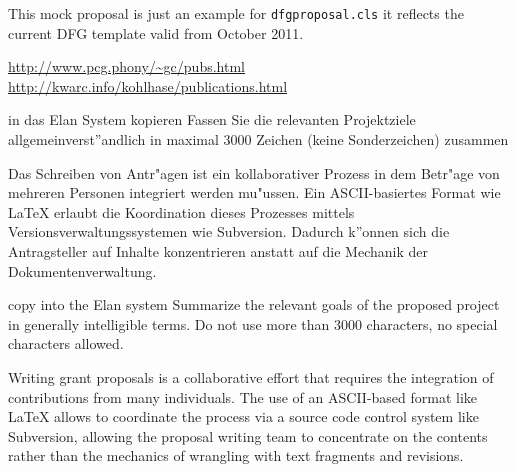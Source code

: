 \documentclass[RAM,gitinfo]{dfgproposal}
\begin{document}
\begin{center}\color{red}\huge
  This mock proposal is just an example for \texttt{dfgproposal.cls} it reflects the 
  current DFG template valid from October 2011.
\end{center}

\urldef{\gcpubs}\url{http://www.pcg.phony/~gc/pubs.html}
\urldef{\mikopubs}\url{http://kwarc.info/kohlhase/publications.html}
\begin{proposal}[PI=miko,PI=gc,site=jacu,site=pcg,
  thema=Intelligentes Schreiben von Antr\"agen,
  acronym={iPoWr},
  acrolong={\underline{I}ntelligent} {\underline{P}r\underline{o}posal} {\underline{Wr}iting},
  title=\pn: \protect\pnlong,
  totalduration=3 years,
  since=1. Feb 2009,
  start=1. Feb. 2010,
  months=24,
  pcgRM=36, pcgRAM=36, jacuRM=36, jacuRAM=36,
  discipline=Computer Science, 
  areas=Knowledge Management]

\begin{Zusammenfassung}
  \begin{todo}{in das Elan System kopieren}
    Fassen Sie die relevanten Projektziele allgemeinverst''andlich in maximal 3000 Zeichen
    (keine Sonderzeichen) zusammen
  \end{todo}
  Das Schreiben von Antr"agen ist ein kollaborativer Prozess in dem Betr"age von mehreren
  Personen integriert werden mu"ussen. Ein ASCII-basiertes Format wie {\LaTeX} erlaubt die
  Koordination dieses Prozesses mittels Versionsverwaltungssystemen wie
  Subversion. Dadurch k''onnen sich die Antragsteller auf Inhalte konzentrieren anstatt
  auf die Mechanik der Dokumentenverwaltung.
\end{Zusammenfassung}

\begin{Summary}
  \begin{todo}{copy into the Elan system}
    Summarize the relevant goals of the proposed project in generally intelligible
    terms. Do not use more than 3000 characters, no special characters allowed.
  \end{todo}
  Writing grant proposals is a collaborative effort that requires the integration of
  contributions from many individuals. The use of an ASCII-based format like {\LaTeX}
  allows to coordinate the process via a source code control system like Subversion,
  allowing the proposal writing team to concentrate on the contents rather than the
  mechanics of wrangling with text fragments and revisions.
\end{Summary}


\end{proposal}
\end{document}
